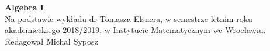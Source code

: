 \documentclass[twoside,10pt]{article}
\begin{document}
  
    \begin{titlepage} 
        \begin{center} 
            \textbf{\Huge{ Algebra I}} \\[1cm]
            Na podstawie wykładu dr Tomasza Elsnera, w semestrze letnim roku akademieckiego 2018/2019, 
            w Instytucie Matematycznym we Wrocławiu. \\ 
            Redagował Michał Syposz 
        \end{center} 
        \tableofcontents
    \end{titlepage} 
    
     
    
    
    
    
    
    
    
    
\end{document}
